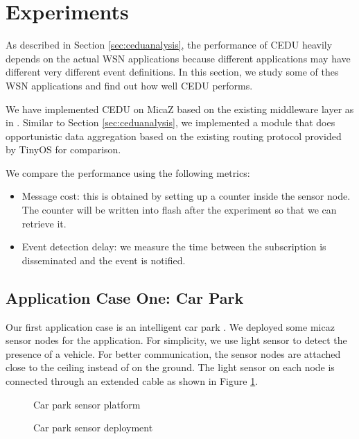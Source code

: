 \section{Experiments}
\label{sec:experiments}
As described in Section \ref{sec:ceduanalysis}, the performance of CEDU heavily depends on the actual WSN applications because different applications may have different very different event definitions. In this section, we study some of thes WSN applications and find out how well CEDU performs.

We have implemented CEDU on MicaZ based on the existing middleware layer as in \cite{lai:psware}. Similar to Section \ref{sec:ceduanalysis}, we implemented a module that does opportunistic data aggregation based on the existing routing protocol provided by TinyOS for comparison.

We compare the performance using the following metrics:
\begin{itemize}
\item Message cost: this is obtained by setting up a counter inside the sensor node. The counter will be written into flash after the experiment so that we can retrieve it.
\item Event detection delay: we measure the time between the subscription is disseminated and the event is notified.
\end{itemize}

\subsection{Application Case One: Car Park}
Our first application case is an intelligent car park \cite{tang:carpark}. We deployed some micaz sensor nodes for the application. For simplicity, we use light sensor to detect the presence of a vehicle. For better communication, the sensor nodes are attached close to the ceiling instead of on the ground. The light sensor on each node is connected through an extended cable as shown in Figure \ref{fig:carParkSensor}. 

\begin{figure}
\centering
{}
\caption{Car park sensor platform}
\label{fig:carParkSensor}
\end{figure}

\begin{figure}
\centering
{}
\caption{Car park sensor deployment}
\label{fig:carParkDeployment}
\end{figure}

